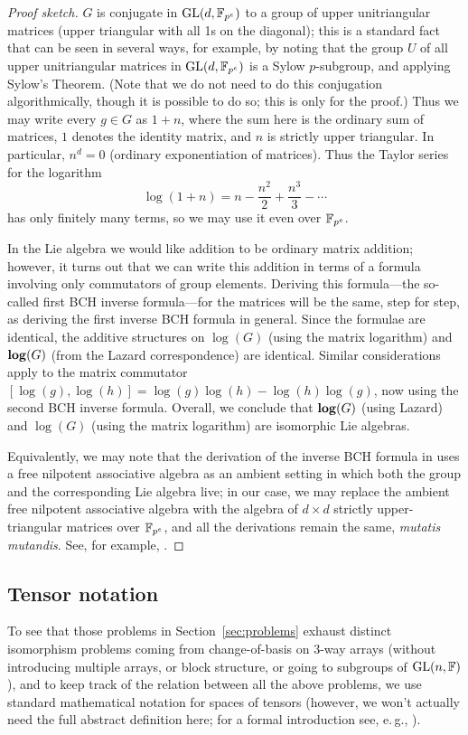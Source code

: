 \documentclass[11pt]{article}
\begin{document}
\begin{proof}[Proof sketch]
$G$ is conjugate in $\mathrm{GL}(d,\mathbb{F}_{p^e})$ to a group of upper unitriangular matrices (upper triangular with all 1s on the diagonal); this is a standard fact that can be seen in several ways, for example, by noting that the group $U$ of all upper unitriangular matrices in $\mathrm{GL}(d,\mathbb{F}_{p^e})$ is a Sylow $p$-subgroup, and applying Sylow's Theorem. (Note that we do not need to do this conjugation algorithmically, though it is possible to do so; this is only for the proof.) 
Thus we may write every $g \in G$ as $1 + n$, where the sum here is the ordinary sum of matrices, $1$ denotes the identity matrix, and $n$ is strictly upper triangular. In particular, $n^d = 0$ (ordinary exponentiation of matrices). Thus the Taylor series for the logarithm
\[
\log(1 + n) = n - \frac{n^2}{2} + \frac{n^3}{3} - \dotsb
\]
has only finitely many terms, so we may use it even over $\mathbb{F}_{p^e}$. 

In the Lie algebra we would like addition to be ordinary matrix addition; however, it turns out that we can write this addition in terms of a formula involving only commutators of group elements. Deriving this formula---the so-called first BCH inverse formula---for the matrices will be the same, step for step, as deriving the first inverse BCH formula in general. Since the formulae are identical, the additive structures on $\log(G)$ (using the matrix logarithm) and $\mathbf{log}(G)$ (from the Lazard correspondence) are identical. Similar considerations apply to the matrix commutator $[\log(g), \log(h)] = \log(g) \log(h) - \log(h)\log(g)$, now using the second BCH inverse formula. Overall, we conclude that $\mathbf{log}(G)$ (using Lazard) and $\log(G)$ (using the matrix logarithm) are isomorphic Lie algebras.

Equivalently, we may note that the derivation of the inverse BCH formula in \cite{khukhro,naik} uses a free nilpotent associative algebra as an ambient setting in which both the group and the corresponding Lie algebra live; in our case, we may replace the ambient free nilpotent associative algebra with the algebra of $d \times d$ strictly upper-triangular matrices over $\mathbb{F}_{p^e}$, and all the derivations remain the same, \emph{mutatis mutandis}. See, for example, \cite[p.~105, ``Another remark...'']{khukhro}.
\end{proof}

\subsection{Tensor notation} \label{sec:prelim:tensor}
To see that those problems in Section~\ref{sec:problems} exhaust 
distinct 
isomorphism problems coming from change-of-basis on 3-way arrays (without 
introducing multiple arrays, or block structure, or going to subgroups of $\mathrm{GL}(n, 
\mathbb{F})$), and to keep track of the relation between all the above problems, we use 
standard mathematical notation for spaces of tensors (however, we won't actually 
need the full abstract definition here; for a formal introduction see, e.\,g., 
\cite{Lan12}).
\end{document}
